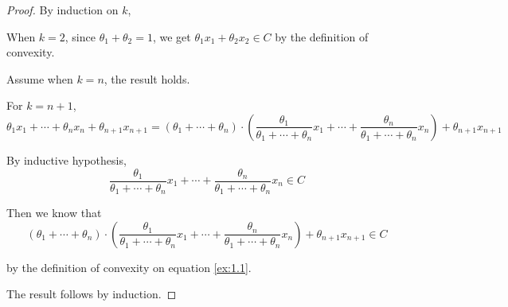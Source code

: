 \begin{proof}
By induction on $k$,

When $k = 2$, since $\theta_{1} + \theta_{2} = 1$, we get $\theta_{1} x_{1} + \theta_{2} x_{2} \in C$ by the definition of convexity.

Assume when $k = n$, the result holds.

For $k = n + 1$, 
\begin{equation}
 \theta_{1} x_{1}+\cdots + \theta_{n} x_{n} + \theta_{n+1} x_{n+1} = (\theta_{1} + \cdots + \theta_{n} ) \cdot ( \frac{\theta_1}{\theta_{1} + \cdots + \theta_{n}} x_{1} + \cdots + \frac{\theta_n}{\theta_{1} + \cdots + \theta_{n}} x_{n}) +  \theta_{n+1} x_{n+1}
\label{ex:1.1}
\end{equation}

By inductive hypothesis,
$$ \frac{\theta_1}{\theta_{1} + \cdots + \theta_{n}} x_{1} + \cdots + \frac{\theta_n}{\theta_{1} + \cdots + \theta_{n}} x_{n} \in C $$

Then we know that $$ (\theta_{1} + \cdots + \theta_{n} ) \cdot ( \frac{\theta_1}{\theta_{1} + \cdots + \theta_{n}} x_{1} + \cdots + \frac{\theta_n}{\theta_{1} + \cdots + \theta_{n}} x_{n}) +  \theta_{n+1} x_{n+1} \in C $$

by the definition of convexity on equation \ref{ex:1.1}.


The result follows by induction. 
\end{proof}



